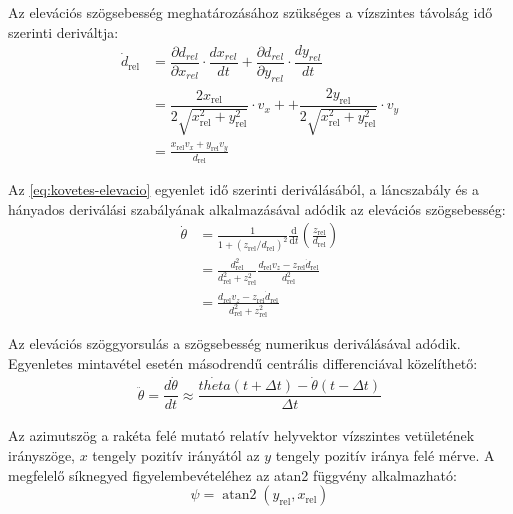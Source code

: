 Az elevációs szögsebesség meghatározásához szükséges a vízszintes
távolság idő szerinti deriváltja:
\begin{align}
    \dot{d}_{\mathrm{rel}}
    &= \dfrac{\partial d_{rel}}{\partial x_{rel}}\cdot \dfrac{d x_{rel}}{d t}
       + \dfrac{\partial d_{rel}}{\partial y_{rel}} \cdot \dfrac{d y_{rel}}{d t} \\
    & = \dfrac{2x_\mathrm{rel}}{2\sqrt{x_{\mathrm{rel}}^2+y_{\mathrm{rel}}^2}}
       \cdot v_x+ + \dfrac{2y_\mathrm{rel}}{2\sqrt{x_{\mathrm{rel}}^2+y_{\mathrm{rel}}^2}}
       \cdot v_y \\
    &= \frac{x_{\mathrm{rel}}v_x+y_{\mathrm{rel}}v_y}{d_{\mathrm{rel}}}
    \label{eq:kovetes-vizszintes-sebesseg}
\end{align}


Az \eqref{eq:kovetes-elevacio} egyenlet idő szerinti
deriválásából, a láncszabály és a hányados deriválási
szabályának alkalmazásával adódik az elevációs szögsebesség:
\begin{equation}
    \begin{aligned}
        \dot{\theta}
        &= \frac{1}{1+\left(z_{\mathrm{rel}}/d_{\mathrm{rel}}\right)^2}
           \frac{\mathrm{d}}{\mathrm{d}t}
           \left(\frac{z_{\mathrm{rel}}}{d_{\mathrm{rel}}}\right) \\
        &= \frac{d_{\mathrm{rel}}^2}
                {d_{\mathrm{rel}}^2+z_{\mathrm{rel}}^2}
           \frac{d_{\mathrm{rel}}v_z-z_{\mathrm{rel}}\dot{d}_{\mathrm{rel}}}
                {d_{\mathrm{rel}}^2} \\
        &= \frac{d_{\mathrm{rel}}v_z-z_{\mathrm{rel}}\dot{d}_{\mathrm{rel}}}
                {d_{\mathrm{rel}}^2+z_{\mathrm{rel}}^2}
    \end{aligned}
    \label{eq:kovetes-elevacios-szogsebesseg}
\end{equation}

Az elevációs szöggyorsulás a szögsebesség numerikus deriválásával adódik. 
Egyenletes mintavétel esetén másodrendű centrális differenciával közelíthető:
\begin{align}
    \ddot{\theta} = \dfrac{d \dot{\theta}}{dt} \approx \dfrac{\dot{theta}(t+\Delta t)-\dot{\theta}(t-\Delta t)}{\Delta t}
\label{eq:kovetes-elevacios-szoggyorsulas}
\end{align}

Az azimutszög a rakéta felé mutató relatív helyvektor vízszintes vetületének irányszöge,
$x$ tengely pozitív irányától az $y$ tengely pozitív
iránya felé mérve.  A megfelelő síknegyed figyelembevételéhez
az atan2 függvény alkalmazható:
\begin{equation}
    \psi = \operatorname{atan2}(y_{\mathrm{rel}},x_{\mathrm{rel}})
    \label{eq:kovetes-azimut}
\end{equation}

